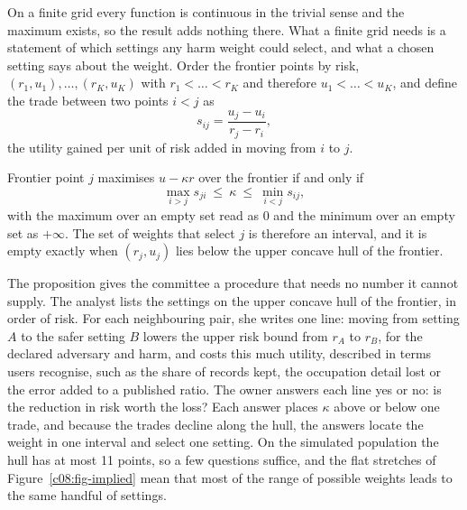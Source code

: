 On a finite grid every function is continuous in the trivial sense and the maximum
exists, so the result adds nothing there. What a finite grid needs is a statement of
which settings any harm weight could select, and what a chosen setting says about
the weight. Order the frontier points by risk, $(r_1, u_1), \dots, (r_K, u_K)$ with
$r_1 < \dots < r_K$ and therefore $u_1 < \dots < u_K$, and define the trade between
two points $i < j$ as
\[
s_{ij} = \frac{u_j - u_i}{r_j - r_i},
\]
the utility gained per unit of risk added in moving from $i$ to $j$.

\begin{proposition}\label{c08:prop-bracket}
Frontier point $j$ maximises $u - \kappa r$ over the frontier if and only if
\begin{equation}\label{c08:eq-bracket}
\max_{i > j} s_{ji} \ \le\ \kappa\ \le\ \min_{i < j} s_{ij},
\end{equation}
with the maximum over an empty set read as $0$ and the minimum over an empty set as
$+\infty$. The set of weights that select $j$ is therefore an interval, and it is
empty exactly when $(r_j, u_j)$ lies below the upper concave hull of the frontier.
\end{proposition}

The proposition gives the committee a procedure that needs no number it cannot
supply. The analyst lists the settings on the upper concave hull of the frontier,
in order of risk. For each neighbouring pair, she writes one line: moving from
setting $A$ to the safer setting $B$ lowers the upper risk bound from $r_A$ to $r_B$,
for the declared adversary and harm, and costs this much utility, described in terms
users recognise, such as the share of records kept, the occupation detail lost or
the error added to a published ratio. The owner answers each line yes or no: is the
reduction in risk worth the loss? Each answer places $\kappa$ above or below one
trade, and because the trades decline along the hull, the answers locate the weight
in one interval and select one setting. On the simulated population the hull has
at most 11 points, so a few questions suffice, and the flat stretches of
Figure~\ref{c08:fig-implied} mean that most of the range of possible weights leads
to the same handful of settings.

